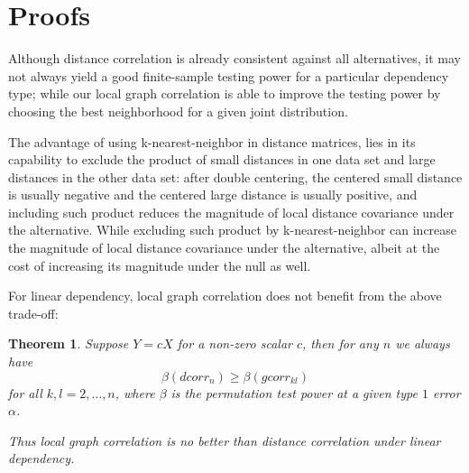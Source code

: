 \documentclass[11pt]{article}
\newtheorem{thm}{Theorem}
\begin{document}
\section{Proofs}

Although distance correlation is already consistent against all alternatives, it may not always yield a good finite-sample testing power for a particular dependency type; while our local graph correlation is able to improve the testing power by choosing the best neighborhood for a given joint distribution. 


The advantage of using k-nearest-neighbor in distance matrices, lies in its capability to exclude the product of small distances in one data set and large distances in the other data set: after double centering, the centered small distance is usually negative and the centered large distance is usually positive, and including such product reduces the magnitude of local distance covariance under the alternative. While excluding such product by k-nearest-neighbor can increase the magnitude of local distance covariance under the alternative, albeit at the cost of increasing its magnitude under the null as well. 


For linear dependency, local graph correlation does not benefit from the above trade-off:

\begin{thm}
\label{thm2}
Suppose $Y=cX$ for a non-zero scalar $c$, then for any $n$ we always have
\begin{equation}
\label{equ1}
\beta(dcorr_{n}) \geq \beta(gcorr_{kl})
\end{equation}
for all $k,l=2,\ldots,n$, where $\beta$ is the permutation test power at a given type $1$ error $\alpha$.

Thus local graph correlation is no better than distance correlation under linear dependency.
\end{thm}





\end{document}
